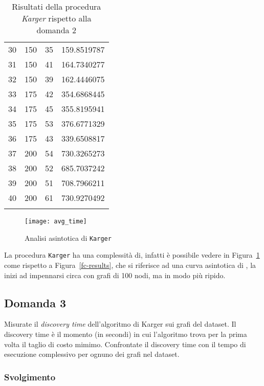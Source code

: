 \begin{center}
\begin{longtable}{|c|c|c|c|}
		30 & 150 & 35 & 159.8519787 \\		 	
		31 & 150 & 41 & 164.7340277 \\		
		32 & 150 & 39 & 162.4446075 \\		
		33 & 175 & 42 & 354.6868445 \\		
		34 & 175 & 45 & 355.8195941 \\		 
		35 & 175 & 53 & 376.6771329 \\		   
		36 & 175 & 43 & 339.6508817 \\		
		37 & 200 & 54 & 730.3265273 \\		
		38 & 200 & 52 & 685.7037242 \\		
		39 & 200 & 51 & 708.7966211 \\		
		40 & 200 & 61 & 730.9270492 \\			
		\hline
		\caption{Risultati della procedura \textit{Karger} rispetto alla domanda 2}
		\label{k-results}
	\end{longtable}
\end{center}\vspace{-40pt}

\begin{figure}[H]
	\centering
	\texttt{[image: avg\_time]}
	\caption{Analisi asintotica di \texttt{Karger}}
	\label{k-confronto}
\end{figure}

La procedura \texttt{Karger} ha una complessità di, infatti è possibile vedere in Figura~\ref{k-results} come rispetto a Figura~\ref{fc-results}, che si riferisce ad una curva asintotica di , la inizi ad impennarsi circa con grafi di 100 nodi, ma in modo più ripido.

\subsection{Domanda 3}
Misurate il \textit{discovery time} dell'algoritmo di Karger sui grafi del dataset. Il discovery time è il momento (in secondi) in cui l'algoritmo trova per la prima volta il taglio di costo mimimo.  Confrontate il discovery time con il tempo di esecuzione complessivo per ognuno dei grafi nel dataset.

\subsubsection{Svolgimento}

